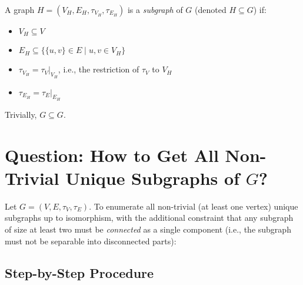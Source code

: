 \documentclass{article}
\begin{document}
A graph \( H = (V_H, E_H, \tau_{V_H}, \tau_{E_H}) \) is a \emph{subgraph} of \( G \) (denoted \( H \subseteq G \)) if:
\begin{itemize}
    \item \( V_H \subseteq V \)
    \item \( E_H \subseteq \{ \{u, v\} \in E \mid u, v \in V_H \} \)
    \item \( \tau_{V_H} = \tau_V|_{V_H} \), i.e., the restriction of \( \tau_V \) to \( V_H \)
    \item \( \tau_{E_H} = \tau_E|_{E_H} \)
\end{itemize}

Trivially, \( G \subseteq G \).
\section*{Question: How to Get All Non-Trivial Unique Subgraphs of \( G \)?}

Let \( G = (V, E, \tau_V, \tau_E) \). To enumerate all non-trivial (at least one vertex) unique subgraphs up to isomorphism, with the additional constraint that any subgraph of size at least two must be \emph{connected} as a single component (i.e., the subgraph must not be separable into disconnected parts):

\subsection*{Step-by-Step Procedure}
\end{document}
